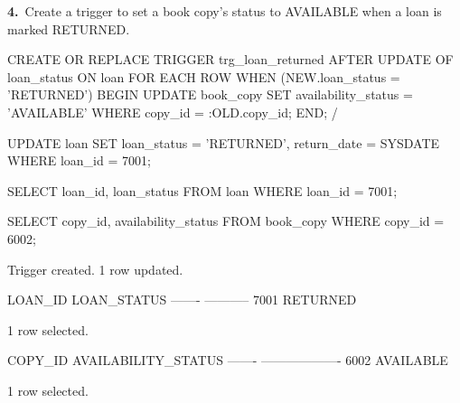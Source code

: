 \noindent\begin{minipage}{\linewidth}
\begingroup{}
{\fontsize{14}{17}\selectfont\textbf{4.}}\ Create a trigger to set a book copy's status to AVAILABLE when a loan is marked RETURNED.\par
\endgroup\vspace{12pt}


\begin{sqlcode}
CREATE OR REPLACE TRIGGER trg_loan_returned
AFTER UPDATE OF loan_status ON loan
FOR EACH ROW
WHEN (NEW.loan_status = 'RETURNED')
BEGIN
   UPDATE book_copy
   SET availability_status = 'AVAILABLE'
   WHERE copy_id = :OLD.copy_id;
END;
/

UPDATE loan SET loan_status = 'RETURNED', return_date = SYSDATE
WHERE loan_id = 7001;

SELECT loan_id, loan_status FROM loan WHERE loan_id = 7001;

SELECT copy_id, availability_status FROM book_copy WHERE copy_id = 6002;
\end{sqlcode}

\vspace{18pt}


\begin{sqlout}[fontsize=\small]
Trigger created.
1 row updated.

LOAN_ID  LOAN_STATUS
-------  -----------
   7001  RETURNED

1 row selected.

COPY_ID  AVAILABILITY_STATUS
-------  -------------------
   6002  AVAILABLE

1 row selected.
\end{sqlout}
\end{minipage}\par\vspace{24pt}

